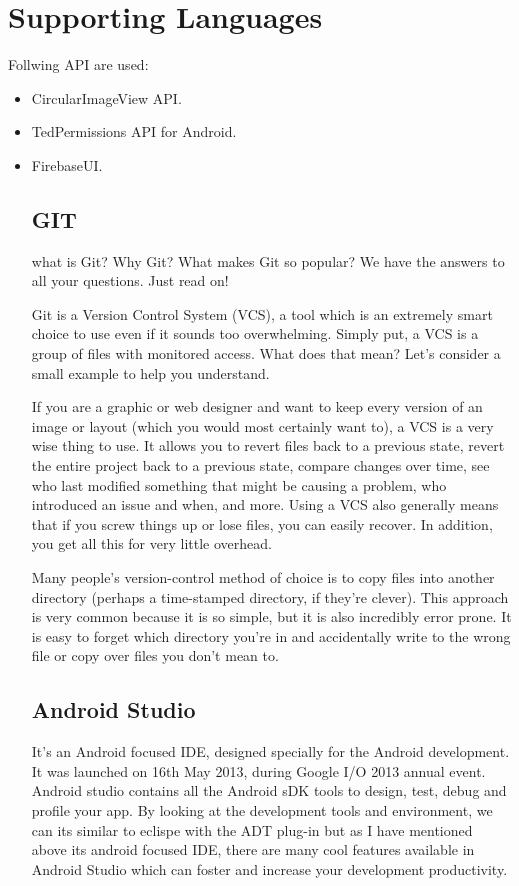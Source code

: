 \section{Supporting Languages}
Follwing API are used:
\begin{itemize}
	\item CircularImageView API.
	\item TedPermissions API for Android.
	\item FirebaseUI.
	\subsection{GIT}
	what is Git? Why Git? What makes Git so popular? We have the answers to all your questions. Just read on!
	
	Git is a Version Control System (VCS), a tool which is an extremely smart choice to use even if it sounds too overwhelming. Simply put, a VCS is a group of files with monitored access. What does that mean? Let's consider a small example to help you understand.
	
	If you are a graphic or web designer and want to keep every version of an image or layout (which you would most certainly want to), a VCS is a very wise thing to use. It allows you to revert files back to a previous state, revert the entire project back to a previous state, compare changes over time, see who last modified something that might be causing a problem, who introduced an issue and when, and more. Using a VCS also generally means that if you screw things up or lose files, you can easily recover. In addition, you get all this for very little overhead.
	
	Many people's version-control method of choice is to copy files into another directory (perhaps a time-stamped directory, if they're clever). This approach is very common because it is so simple, but it is also incredibly error prone. It is easy to forget which directory you're in and accidentally write to the wrong file or copy over files you don't mean to.
	\subsection{Android Studio}
	It’s an Android focused IDE, designed specially for the Android development. It was launched on 16th May 2013, during Google I/O 2013 annual event. Android studio contains all the Android sDK tools to design, test, debug and profile your app. By looking at the development tools and environment, we can its similar to eclispe with the ADT plug-in but as I have mentioned above its android focused IDE, there are many cool features available in Android Studio which can foster and increase your development productivity.
	

\end{itemize}
